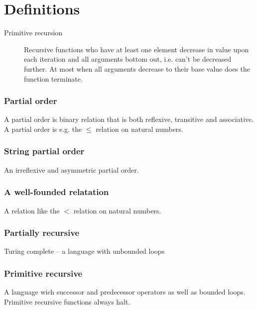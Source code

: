 \chapter{Definitions}

\begin{description}

\item [Primitive recursion] Recursive functions who have at least one element
decrease in value upon each iteration and all arguments bottom out, i.e. can't
be decreased further. At most when all arguments decrease to their base value
does the function terminate.

\end{description}

\subsection{Partial order}

A partial order is binary relation that is both reflexive, transitive and
associative. A partial order is e.g. the $\leq$ relation on natural numbers.

\subsection{String partial order}

An irreflexive and asymmetric partial order.

\subsection{A well-founded relatation}

A relation like the $<$ relation on natural numbers.



\subsection{Partially recursive}

Turing complete -- a language with unbounded loops

\subsection{Primitive recursive}

A language wich successor and predecessor operators as well as bounded loops.
Primitive recursive functions always halt.
